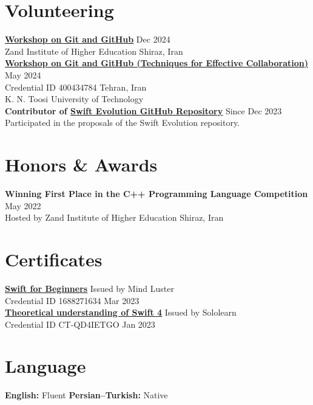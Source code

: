 \documentclass[letter,10pt]{article}
\begin{document}
\section*{Volunteering}
\href{https://github.com/karami-mehdi/CV/blob/main/Assets/certificate-of-workshop-participation-karami-mehdi-zand-ihe.pdf}{\underline{\textbf{Workshop on Git and GitHub}}} \hfill Dec 2024 \\ [2pt]
Zand Institute of Higher Education \hfill Shiraz, Iran \\ [5pt]
\href{https://github.com/karami-mehdi/CV/blob/main/Assets/certificate-of-workshop-participation-karami-mehdi.pdf}{\underline{\textbf{Workshop on Git and GitHub (Techniques for Effective Collaboration)}}} \hfill May 2024 \\ [2pt]
Credential ID 400434784 \hfill Tehran, Iran \\ 
K. N. Toosi University of Technology \\ [5pt]
\textbf{Contributor of \href{https://github.com/swiftlang/swift-evolution}{\underline{\textbf{Swift Evolution GitHub Repository}}}} \hfill Since Dec 2023 \\ [2pt]
Participated in the proposals of the Swift Evolution repository.

\section*{Honors \& Awards}
\noindent
\textbf{Winning First Place in the C++ Programming Language Competition} \hfill May 2022 \\
Hosted by Zand Institute of Higher Education \hfill Shiraz, Iran

\section*{Certificates}
\noindent
\href{https://www.mindluster.com/storage/cer/1688271634.jpg}{\underline{\textbf{Swift for Beginners}}} \hfill Issued by Mind Luster \\ [2pt]
Credential ID 1688271634 \hfill Mar 2023 \\ [5pt]
\href{https://www.sololearn.com/certificate/CT-QD4IETGO/png}{\underline{\textbf{Theoretical understanding of Swift 4}}} \hfill Issued by Sololearn \\ [2pt]
Credential ID CT-QD4IETGO \hfill Jan 2023

\section*{Language}
\noindent
\textbf{English:} Fluent \hspace{4em} 
\textbf{Persian–Turkish:} Native
\end{document}
